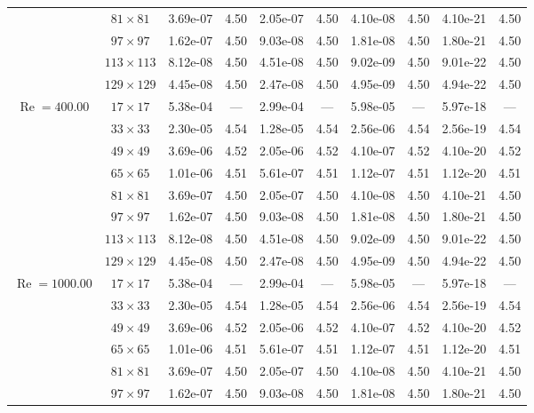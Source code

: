 \documentclass[preprint, 12pt]{elsarticle}
\begin{document}
\begin{center}
\begin{table}[H]
{\begin{tabular*}{\textwidth}{@{\extracolsep\fill}cccccccccc@{}}
    & $81\times 81$ & 3.69e-07 & 4.50 & 2.05e-07 & 4.50 & 4.10e-08 & 4.50 & 4.10e-21 & 4.50 \\
    & $97\times 97$ & 1.62e-07 & 4.50 & 9.03e-08 & 4.50 & 1.81e-08 & 4.50 & 1.80e-21 & 4.50 \\
    & $113\times 113$ & 8.12e-08 & 4.50 & 4.51e-08 & 4.50 & 9.02e-09 & 4.50 & 9.01e-22 & 4.50 \\
    & $129\times 129$ & 4.45e-08 & 4.50 & 2.47e-08 & 4.50 & 4.95e-09 & 4.50 & 4.94e-22 & 4.50 \\
    \hline
    \multirow{7}{*}{$\operatorname{Re}=400.00$} & $17\times 17$ & 5.38e-04 & --- & 2.99e-04 & --- & 5.98e-05 & --- & 5.97e-18 & --- \\
    & $33\times 33$ & 2.30e-05 & 4.54 & 1.28e-05 & 4.54 & 2.56e-06 & 4.54 & 2.56e-19 & 4.54 \\
    & $49\times 49$ & 3.69e-06 & 4.52 & 2.05e-06 & 4.52 & 4.10e-07 & 4.52 & 4.10e-20 & 4.52 \\
    \multirow{3}{*}{$\operatorname{Wi}=5$} & $65\times 65$ & 1.01e-06 & 4.51 & 5.61e-07 & 4.51 & 1.12e-07 & 4.51 & 1.12e-20 & 4.51 \\
    & $81\times 81$ & 3.69e-07 & 4.50 & 2.05e-07 & 4.50 & 4.10e-08 & 4.50 & 4.10e-21 & 4.50 \\
    & $97\times 97$ & 1.62e-07 & 4.50 & 9.03e-08 & 4.50 & 1.81e-08 & 4.50 & 1.80e-21 & 4.50 \\
    & $113\times 113$ & 8.12e-08 & 4.50 & 4.51e-08 & 4.50 & 9.02e-09 & 4.50 & 9.01e-22 & 4.50 \\
    & $129\times 129$ & 4.45e-08 & 4.50 & 2.47e-08 & 4.50 & 4.95e-09 & 4.50 & 4.94e-22 & 4.50 \\
    \hline
    \multirow{7}{*}{$\operatorname{Re}=1000.00$} & $17\times 17$ & 5.38e-04 & --- & 2.99e-04 & --- & 5.98e-05 & --- & 5.97e-18 & --- \\
    & $33\times 33$ & 2.30e-05 & 4.54 & 1.28e-05 & 4.54 & 2.56e-06 & 4.54 & 2.56e-19 & 4.54 \\
    & $49\times 49$ & 3.69e-06 & 4.52 & 2.05e-06 & 4.52 & 4.10e-07 & 4.52 & 4.10e-20 & 4.52 \\
    \multirow{3}{*}{$\operatorname{Wi}=5$} & $65\times 65$ & 1.01e-06 & 4.51 & 5.61e-07 & 4.51 & 1.12e-07 & 4.51 & 1.12e-20 & 4.51 \\
    & $81\times 81$ & 3.69e-07 & 4.50 & 2.05e-07 & 4.50 & 4.10e-08 & 4.50 & 4.10e-21 & 4.50 \\
    & $97\times 97$ & 1.62e-07 & 4.50 & 9.03e-08 & 4.50 & 1.81e-08 & 4.50 & 1.80e-21 & 4.50 \\

\end{tabular*}}
\end{table}
\end{center}
\end{document}
